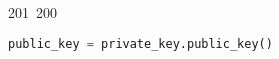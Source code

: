 201~200~\documentclass{article}
\begin{document}
\begin{lstlisting}[language=Python, caption=Key Pair Generation]
	                                                                                                                                                                                                                                                                                                	                                                                                                                                        	    	                                                                                                	                                                                                                                                                                                                                                                                                                                                	                                                                        	                                                                        	                                                                                                                                        	                                                                                                                                                                                                        public_key = private_key.public_key()
	                                                                                                                                                                                                                                                                                                	                                                                                                                                        	    	                                                                                                	                                                                                                                                                                                                                                                                                                                                	                                                                        	                                                                        	                                                                                                                                        	                                                                                                                                                                                                            return private_key, public_key

\end{lstlisting}
\end{document}
